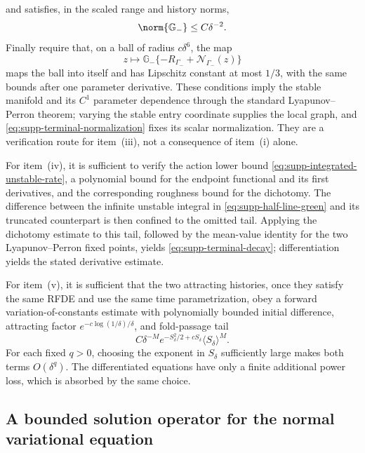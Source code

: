 \begin{remark}
and satisfies, in the scaled range and history norms,
\[
 \norm{\mathbb G_-}\le C\delta^{-2}.
\]
Finally require that, on a ball of radius \(c\delta^6\), the map
\[
 z\longmapsto
 \mathbb G_-\{-R_{\Gamma_-}+\mathcal N_{\Gamma_-}(z)\}
\]
maps the ball into itself and has Lipschitz constant at most \(1/3\), with the
same bounds after one parameter derivative.  These conditions imply the
stable manifold and its \(C^1\) parameter dependence through the standard
Lyapunov--Perron theorem; varying the stable entry coordinate supplies the
local graph, and \cref{eq:supp-terminal-normalization} fixes its scalar
normalization.  They are a verification route for item~\textup{(iii)}, not a
consequence of item~\textup{(i)} alone.

For item~\textup{(iv)}, it is sufficient to verify the action lower bound
\cref{eq:supp-integrated-unstable-rate}, a polynomial bound for the endpoint
functional and its first derivatives, and the corresponding roughness bound
for the dichotomy.  The difference between the infinite unstable integral in
\cref{eq:supp-half-line-green} and its truncated counterpart is then confined
to the omitted tail.  Applying the dichotomy estimate to this tail, followed
by the mean-value identity for the two Lyapunov--Perron fixed points, yields
\cref{eq:supp-terminal-decay}; differentiation yields the stated derivative
estimate.

For item~\textup{(v)}, it is sufficient that the two attracting histories,
once they satisfy the same RFDE and use the same time parametrization, obey a forward
variation-of-constants estimate with polynomially bounded initial
difference, attracting factor
\(e^{-c\log(1/\delta)/\delta}\), and fold-passage tail
\[
 C\delta^{-M}e^{-S_\delta^2/2+cS_\delta}
       \langle S_\delta\rangle^M.
\]
For each fixed \(q>0\), choosing the exponent in \(S_\delta\) sufficiently
large makes both terms \(O(\delta^q)\).  The differentiated equations have
only a finite
additional power loss, which is absorbed by the same choice.
\end{remark}

\subsection{A bounded solution operator for the normal variational equation}

